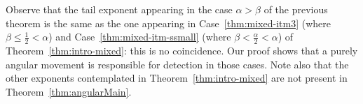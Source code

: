 Observe that the tail exponent appearing in the case $\alpha>\beta$ of the previous theorem is the same as the one appearing in Case~\eqref{thm:mixed-itm3} (where $\beta\leq \frac{1}{2}<\alpha$) and Case~\eqref{thm:mixed-itm-ssmall} (where $\beta<\frac{\alpha}{2}<\alpha$) of Theorem~\ref{thm:intro-mixed}: this is no coincidence. Our proof shows that a purely angular movement is responsible for detection in those cases. Note also that the other exponents contemplated in Theorem~\ref{thm:intro-mixed} are not present in Theorem~\ref{thm:angularMain}. 

